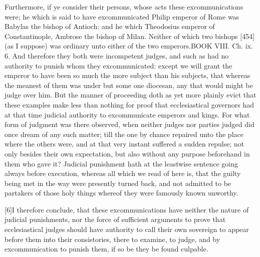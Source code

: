Furthermore, if ye consider their persons, whose acts these excommunications were; he which is said to have excommunicated Philip emperor of Rome was Babylas the bishop of Antioch: and he which Theodosius emperor of Constantinople, Ambrose the bishop of Milan. Neither of which two bishops [454] (as I suppose) was ordinary unto either of the two emperors.BOOK VIII. Ch. ix. 6. And therefore they both were incompetent judges, and such as had no authority to punish whom they excommunicated: except we will grant the emperor to have been so much the more subject than his subjects, that whereas the meanest of them was under but some one diocesan, any that would might be judge over him. But the manner of proceeding doth as yet more plainly evict that these examples make less than nothing for proof that ecclesiastical governors had at that time judicial authority to excommunicate emperors and kings. For what form of judgment was there observed, when neither judges nor parties judged did once dream of any such matter; till the one by chance repaired unto the place where the others were, and at that very instant suffered a sudden repulse; not only besides their own expectation, but also without any purpose beforehand in them who gave it? Judicial punishment hath at the leastwise sentence going always before execution, whereas all which we read of here is, that the guilty being met in the way were presently turned back, and not admitted to be partakers of those holy things whereof they were famously known unworthy.

[6]I therefore conclude, that these excommunications have neither the nature of judicial punishments, nor the force of sufficient arguments to prove that ecclesiastical judges should have authority to call their own sovereign to appear before them into their consistories, there to examine, to judge, and by excommunication to punish them, if so be they be found culpable.

